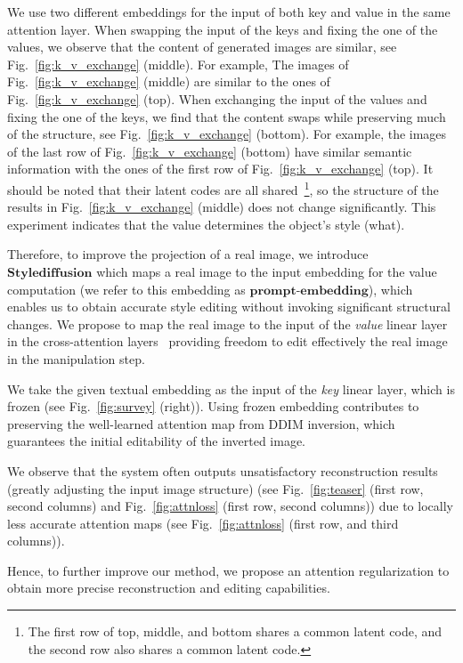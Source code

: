 \documentclass[twocolumn]{svjour3}          \smartqed  \usepackage{graphicx}
\begin{document}
We use two different embeddings for the input of both key and value in the same attention layer. When swapping the input of the keys and fixing the one of the values, we observe that the content of generated images are similar,  see Fig.~\ref{fig:k_v_exchange} (middle). For example, The images of Fig.~\ref{fig:k_v_exchange} (middle) are similar to the ones of  Fig.~\ref{fig:k_v_exchange} (top).  When exchanging the input of the values and fixing the one of the keys, we find that the content swaps while preserving much of the structure,  see Fig.~\ref{fig:k_v_exchange} (bottom). For example, the images of the last row of Fig.~\ref{fig:k_v_exchange} (bottom) have similar semantic information  with the ones of the first row of Fig.~\ref{fig:k_v_exchange} (top).  It should be noted that their latent codes are all shared~\footnote{The first row of top, middle, and bottom shares a common latent code, and the second row also shares a common latent code.}, so the structure of the results in Fig.~\ref{fig:k_v_exchange} (middle) does not change significantly.
This experiment indicates that the value determines the object's style (what).  


Therefore, to improve the projection of a real image, we introduce $\textbf{Stylediffusion}$ which maps a real image to the input embedding for the value computation (we refer to this embedding as $\textbf{prompt-embedding}$),  which enables us to obtain accurate style editing without invoking significant structural changes. 
We propose to map the real image to the input of the \textit{value} linear layer in the cross-attention layers~\citep{bahdanau2014neural,NIPS2017_3f5ee243} providing freedom to edit effectively the real image in the manipulation step.

We take the given textual embedding as  the input of the \textit{key} linear layer, which is frozen (see Fig.~\ref{fig:survey} (right)). Using frozen embedding contributes to preserving the well-learned attention map from DDIM inversion, which guarantees the initial editability of the inverted image. 

We observe that the system often outputs unsatisfactory reconstruction results (greatly adjusting the input image structure) (see Fig.~\ref{fig:teaser} (first row, second columns) and Fig.~\ref{fig:attnloss} (first row, second columns)) due to locally less accurate attention maps (see Fig.~\ref{fig:attnloss} (first row, and third columns)). 

Hence, to further improve our method, we propose an attention regularization to obtain more precise reconstruction and editing capabilities.
\end{document}
